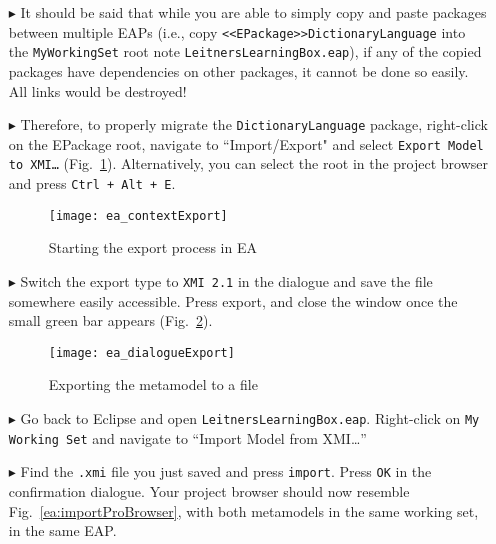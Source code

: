 \begin{itemize}
\item[$\blacktriangleright$] It should be said that while you are able to simply copy and paste packages between multiple EAPs (i.e., copy
\texttt{<<E\-Pack\-age>>Dict\-ion\-ary\-Lang\-uage} into the \texttt{MyWorkingSet} root note \texttt{LeitnersLearningBox.eap}), if any of the copied packages
have dependencies on other packages, it cannot be done so easily. All links would be destroyed! 

\clearpage

\item[$\blacktriangleright$] Therefore, to properly migrate the \texttt{DictionaryLanguage} package, right-click on the EPackage root, navigate to
``Import/Export" and select \texttt{Export Model to XMI\ldots} (Fig.~\ref{ea:contextExport}). Alternatively, you can select the root in the project browser and
press \texttt{Ctrl + Alt + E}.

\vspace{0.5cm}

\begin{figure}[htbp]
\begin{center}
  \texttt{[image: ea\_contextExport]}
  \caption{Starting the export process in EA}
  \label{ea:contextExport}
\end{center}
\end{figure}

\item[$\blacktriangleright$] Switch the export type to \texttt{XMI 2.1} in the dialogue and save the file somewhere easily accessible. Press export, and close
the window once the small green bar appears (Fig.~\ref{ea:export}).

\begin{figure}[htbp]
\begin{center}
  \texttt{[image: ea\_dialogueExport]}
  \caption{Exporting the metamodel to a file}
  \label{ea:export}
\end{center}
\end{figure}

\item[$\blacktriangleright$] Go back to Eclipse and open \texttt{LeitnersLearningBox.eap}. Right-click on \texttt{My Working Set} and navigate to ``Import
Model from XMI\ldots''

\item[$\blacktriangleright$] Find the \texttt{.xmi} file you just saved and
press \texttt{import}. Press \texttt{OK} in the confirmation dialogue. Your project browser should now resemble Fig.~\ref{ea:importProBrowser}, with both metamodels in the same working set, in the same EAP.


\end{itemize}
